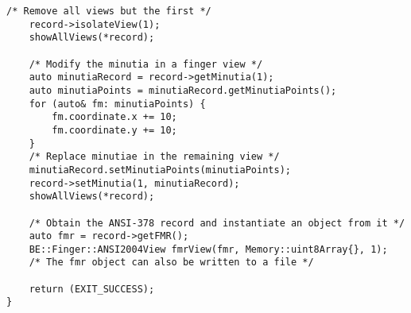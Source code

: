 \begin{lstlisting}[caption={ANSI 2004 Data Interchange}, label=lst:ansi2004diuse]
	/* Remove all views but the first */
	record->isolateView(1);
	showAllViews(*record);

	/* Modify the minutia in a finger view */
	auto minutiaRecord = record->getMinutia(1);
	auto minutiaPoints = minutiaRecord.getMinutiaPoints();
	for (auto& fm: minutiaPoints) {
		fm.coordinate.x += 10;
		fm.coordinate.y += 10;
	}
	/* Replace minutiae in the remaining view */
	minutiaRecord.setMinutiaPoints(minutiaPoints);
	record->setMinutia(1, minutiaRecord);
	showAllViews(*record);

	/* Obtain the ANSI-378 record and instantiate an object from it */
	auto fmr = record->getFMR();
	BE::Finger::ANSI2004View fmrView(fmr, Memory::uint8Array{}, 1);
	/* The fmr object can also be written to a file */
	
	return (EXIT_SUCCESS);
}
\end{lstlisting}
